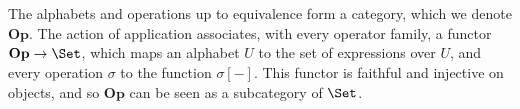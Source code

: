 \begin{code}%
\>[0]\<[2]%
\>[2] \AgdaSymbol{:}  \AgdaSymbol{\{}\AgdaSymbol{\}} \AgdaSymbol{\{}\AgdaSymbol{\}} \AgdaSymbol{\{}\AgdaSymbol{\}} \AgdaSymbol{\{}\AgdaSymbol{\}} \AgdaSymbol{\{}\AgdaSymbol{\}}\<%
\\
\>[2]\<[4]%
\>[4]\AgdaSymbol{\{} \AgdaSymbol{:}   \AgdaSymbol{\}} \AgdaSymbol{(} \AgdaSymbol{:}    \AgdaSymbol{)} \<%
\\
\>[2]\<[4]%
\>[4] \AgdaSymbol{(}  \AgdaSymbol{)} \AgdaSymbol{(}  \AgdaSymbol{)}    \AgdaSymbol{(}  \AgdaSymbol{)}\<%
\end{code}


\newcommand{\Op}{\ensuremath{\mathbf{Op}}}

The alphabets and operations up to equivalence form
a category, which we denote $\Op$.
The action of application associates, with every operator family, a functor $\Op \rightarrow \Set$,
which maps an alphabet $U$ to the set of expressions over $U$, and every operation $\sigma$ to the function $\sigma[-]$.
This functor is faithful and injective on objects, and so $\Op$ can be seen as a subcategory of $\Set$.

\begin{code}%
\>[0]\<[2]%
\>[2] \AgdaSymbol{:}  \AgdaSymbol{\{}\AgdaSymbol{\}} \AgdaSymbol{\{}\AgdaSymbol{\}} \AgdaSymbol{\{}\AgdaSymbol{\}} \AgdaSymbol{\{}\AgdaSymbol{\}} \<[28]%
\>[28]\<%
\\
\>[2]\<[4]%
\>[4]\AgdaSymbol{\{} \AgdaSymbol{:}   \AgdaSymbol{\}} \AgdaSymbol{\{} \AgdaSymbol{:}   \AgdaSymbol{\}} \AgdaSymbol{\{} \AgdaSymbol{:}   \AgdaSymbol{\}}  \<[45]%
\>[45]\<%
\\
\>[2]\<[4]%
\>[4]  \AgdaSymbol{(}  \AgdaSymbol{)}  \AgdaSymbol{(}  \AgdaSymbol{)}  \<%
\end{code}

